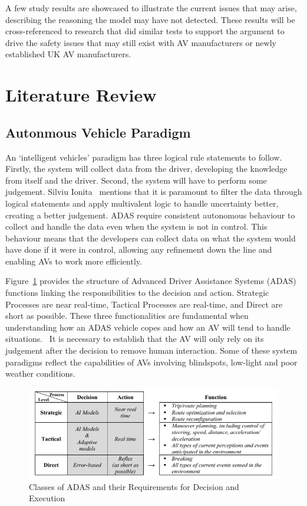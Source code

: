 \documentclass[conference]{IEEEtran}
\begin{document}
	A few study results are showcased to illustrate the current issues that may arise, describing the reasoning the model may have not detected. These results will be cross-referenced to research that did similar tests to support the argument to drive the safety issues that may still exist with AV manufacturers or newly established UK AV manufacturers.

\section{Literature Review}
	\subsection{Autonmous Vehicle Paradigm}
		An `intelligent vehicles' paradigm has three logical rule statements to follow. Firstly, the system will collect data from the driver, developing the knowledge from itself and the driver. Second, the system will have to perform some judgement. Silviu Ionita~\cite{ionita_autonomous_2017} mentions that it is paramount to filter the data through logical statements and apply multivalent logic to handle uncertainty better, creating a better judgement. ADAS require consistent autonomous behaviour to collect and handle the data even when the system is not in control. This behaviour means that the developers can collect data on what the system would have done if it were in control, allowing any refinement down the line and enabling AVs to work more efficiently.

		Figure~\ref{fig:adasFunctionsIonita} provides the structure of Advanced Driver Assistance Systems (ADAS) functions linking the responsibilities to the decision and action. Strategic Processes are near real-time, Tactical Processes are real-time, and Direct are short as possible. These three functionalities are fundamental when understanding how an ADAS vehicle copes and how an AV will tend to handle situations.~\cite{ionita_autonomous_2017} It is necessary to establish that the AV will only rely on its judgement after the decision to remove human interaction. Some of these system paradigms reflect the capabilities of AVs involving blindspots, low-light and poor weather conditions.
		\begin{figure}[h]
			\centering
			\includegraphics[width=\columnwidth]{Figures/SystemFunctionality-3.png}
			\caption{Classes of ADAS and their Requirements for Decision and Execution~\cite{ionita_autonomous_2017}}
			\label{fig:adasFunctionsIonita}
		\end{figure}
\end{document}
